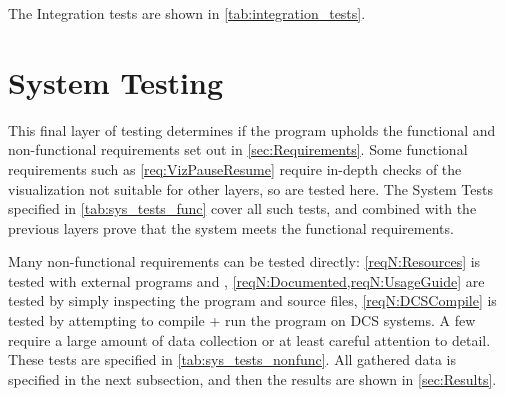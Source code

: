 The Integration tests are shown in \cref{tab:integration_tests}.



\section{System Testing}
This final layer of testing determines if the program upholds the functional and non-functional requirements set out in \cref{sec:Requirements}.
Some functional requirements such as \cref{req:VizPauseResume} require in-depth checks of the visualization not suitable for other layers, so are tested here.
The System Tests specified in \cref{tab:sys_tests_func} cover all such tests, and combined with the previous layers prove that the system meets the functional requirements.

Many non-functional requirements can be tested directly: \cref{reqN:Resources} is tested with external programs  and , \cref{reqN:Documented,reqN:UsageGuide} are tested by simply inspecting the program and source files, \cref{reqN:DCSCompile} is tested by attempting to compile + run the program on DCS systems.
A few require a large amount of data collection or at least careful attention to detail.
These tests are specified in \cref{tab:sys_tests_nonfunc}.
All gathered data is specified in the next subsection, and then the results are shown in \cref{sec:Results}.






